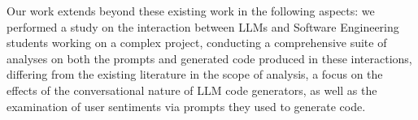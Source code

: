 Our work extends beyond these existing work in the following aspects: we performed a study on the interaction between LLMs and Software Engineering students working on a complex project, conducting a comprehensive suite of analyses on both the prompts and generated code produced in these interactions, differing from the existing literature in the scope of analysis, a focus on the effects of the conversational nature of LLM code generators, as well as the examination of user sentiments via prompts they used to generate code.

